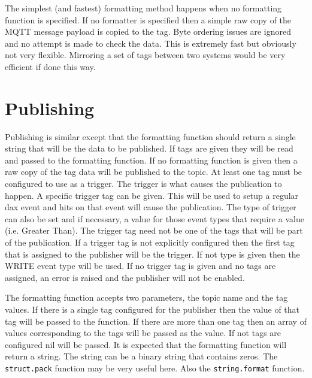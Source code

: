 The simplest (and fastest) formatting method happens when no formatting function is specified.  If no formatter is specified then a simple raw copy of the MQTT message payload is copied to the tag.  Byte ordering issues are ignored and no attempt is made to check the data.  This is extremely fast but obviously not very flexible.  Mirroring a set of tags between two \opendax systems would be very efficient if done this way.

\section{Publishing}

Publishing is similar except that the formatting function should return a single string that will be the data to be published.  If tags are given they will be read and passed to the formatting function.  If no formatting function is given then a raw copy of the tag data will be published to the topic.  At least one tag must be configured to use as a trigger.  The trigger is what causes the publication to happen.  A specific trigger tag can be given.  This will be used to setup a regular dax event and hits on that event will cause the publication.  The type of trigger can also be set and if necessary, a value for those event types that require a value (i.e. Greater Than).  The trigger tag need not be one of the tags that will be part of the publication.  If a trigger tag is not explicitly configured then the first tag that is assigned to the publisher will be the trigger.  If not type is given then the WRITE event type will be used.  If no trigger tag is given and no tags are assigned, an error is raised and the publisher will not be enabled.

The formatting function accepts two parameters, the topic name and the tag values.  If there is a single tag configured for the publisher then the value of that tag will be passed to the function.  If there are more than one tag then an array of values corresponding to the tags will be passed as the value.  If not tags are configured nil will be passed.  It is expected that the formatting function will return a string.  The string can be a binary string that contains zeros.  The \texttt{struct.pack} function may be very useful here.  Also the \texttt{string.format} function.